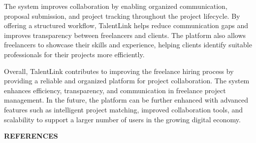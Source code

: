 \documentclass[12pt,a4paper,oneside]{report}
\numberwithin{figure}{chapter}
\numberwithin{table}{chapter}
\begin{document}
\indent The system improves collaboration by enabling organized communication, proposal
submission, and project tracking throughout the project lifecycle. By offering a
structured workflow, TalentLink helps reduce communication gaps and improves transparency
between freelancers and clients. The platform also allows freelancers to showcase their
skills and experience, helping clients identify suitable professionals for their projects
more efficiently.

\indent Overall, TalentLink contributes to improving the freelance hiring process by
providing a reliable and organized platform for project collaboration. The system enhances
efficiency, transparency, and communication in freelance project management. In the
future, the platform can be further enhanced with advanced features such as intelligent
project matching, improved collaboration tools, and scalability to support a larger number
of users in the growing digital economy.

\newpage
\begin{center}
  {\fontsize{16}{20}\selectfont\bfseries REFERENCES}
\end{center}
\vspace{2\baselineskip}
\end{document}

